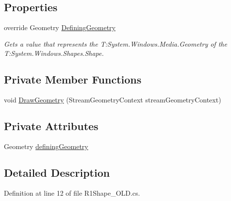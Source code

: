 \subsection*{Properties}
\begin{DoxyCompactItemize}
\item 
override Geometry \hyperlink{class_c_p_u___o_s___simulator_1_1_controls_1_1_resource___controls_1_1_shapes_1_1_r1_shape___o_l_d_a1c3937c21ab74e78490e52c37f6869a3}{Defining\+Geometry}
\begin{DoxyCompactList}\small\item\em Gets a value that represents the T\+:\+System.\+Windows.\+Media.\+Geometry of the T\+:\+System.\+Windows.\+Shapes.\+Shape. \end{DoxyCompactList}\end{DoxyCompactItemize}
\subsection*{Private Member Functions}
\begin{DoxyCompactItemize}
\item 
void \hyperlink{class_c_p_u___o_s___simulator_1_1_controls_1_1_resource___controls_1_1_shapes_1_1_r1_shape___o_l_d_a5da0c7c27433170b97b2862ae5f4f7b3}{Draw\+Geometry} (Stream\+Geometry\+Context stream\+Geometry\+Context)
\end{DoxyCompactItemize}
\subsection*{Private Attributes}
\begin{DoxyCompactItemize}
\item 
Geometry \hyperlink{class_c_p_u___o_s___simulator_1_1_controls_1_1_resource___controls_1_1_shapes_1_1_r1_shape___o_l_d_aba9a4422214675849bada0c7754d1b77}{defining\+Geometry}
\end{DoxyCompactItemize}


\subsection{Detailed Description}


Definition at line 12 of file R1\+Shape\+\_\+\+O\+L\+D.\+cs.




